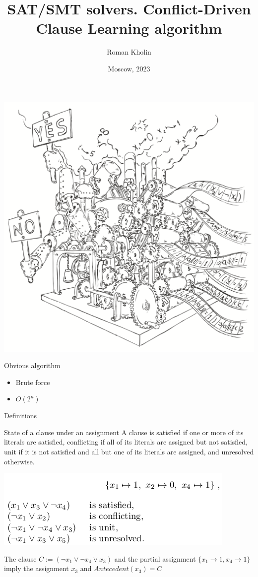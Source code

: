 \documentclass{beamer}
\begin{document}
\title{SAT/SMT solvers. Conflict-Driven Clause Learning algorithm}
\author{Roman Kholin}
\date{Moscow, 2023}

\begin{frame}
\includegraphics[scale=0.5]{../decision-procedure.png}
\end{frame}

\frame{\titlepage}

\begin{frame}{Obvious algorithm}
\begin{itemize}
\item Brute force
\item $O(2^n)$
\end{itemize}
\end{frame}

\begin{frame}{Definitions}
\begin{block}{State of a clause under an assignment}
A clause is satisfied if one or more of its literals are satisfied, conflicting if all of its literals are assigned but not satisfied, unit if it is not satisfied and all but one of its literals are assigned, and unresolved otherwise.
\end{block}
\includegraphics[scale=0.5]{assign.png}
\begin{block}{}
The clause $C := (\lnot x_1 \vee \lnot x_4 \vee x_3)$ and the partial assignment $\{x_1 \rightarrow 1, x_4 \rightarrow 1\}$ imply the assignment $x_3$ and $Antecedent(x_3) = C$
\end{block}
\end{frame}
\end{document}
